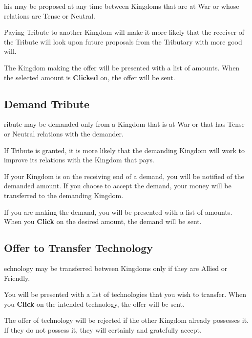 
his may be proposed at any time between Kingdoms that are at War or whose relations are Tense or Neutral.

Paying Tribute to another Kingdom will make it more likely that the receiver of the Tribute will look upon future proposals from the Tributary with more good will.

The Kingdom making the offer will be presented with a list of amounts. When the selected amount is \textbf{Clicked} on, the offer will be sent.

\subsection{Demand Tribute}


ribute may be demanded only from a Kingdom that is at War or that has Tense or Neutral relations with the demander.

If Tribute is granted, it is more likely that the demanding Kingdom will work to improve its relations with the Kingdom that pays.


If your Kingdom is on the receiving end of a demand, you will be notified of the demanded amount. If you choose to accept the demand, your money will be transferred to the demanding Kingdom.

If you are making the demand, you will be presented with a list of amounts. When you \textbf{Click} on the desired amount, the demand will be sent.

\subsection{Offer to Transfer Technology}


echnology may be transferred between Kingdoms only if they are Allied or Friendly.

You will be presented with a list of technologies that you wish to transfer. When you \textbf{Click} on the intended technology, the offer will be sent.

The offer of technology will be rejected if the other Kingdom already possesses it. If they do not possess it, they will certainly and gratefully accept.

